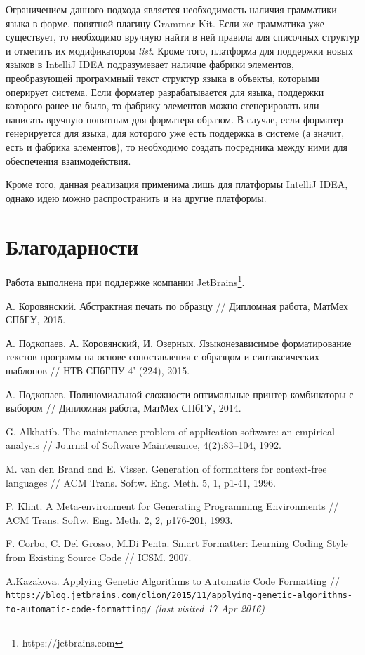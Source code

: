 \documentclass[conference]{IEEEtran}
\begin{document}
Ограничением данного подхода является необходимость наличия грамматики языка в форме, понятной плагину Grammar-Kit. 
Если же грамматика уже существует, то необходимо вручную найти в ней правила для списочных структур и отметить их модификатором \emph{list}.
Кроме того, платформа для поддержки новых языков в IntelliJ IDEA подразумевает наличие фабрики элементов, преобразующей программный текст структур языка в объекты, которыми оперирует система.
Если форматер разрабатывается для языка, поддержки которого ранее не было, то фабрику элементов можно сгенерировать или написать вручную понятным для форматера образом.
В случае, если форматер генерируется для языка, для которого уже есть поддержка в системе (а значит, есть и фабрика элементов), то необходимо создать посредника между ними для обеспечения взаимодействия.

Кроме того, данная реализация применима лишь для платформы IntelliJ IDEA, однако идею можно распространить и на другие платформы.

\section*{Благодарности}
Работа выполнена при поддержке компании JetBrains\footnote{https://jetbrains.com}.

\nocite{*}


\begin{thebibliography}{4}

  А. Коровянский. Абстрактная печать по образцу
  // Дипломная работа, МатМех СПбГУ, 2015.

  А. Подкопаев, А. Коровянский, И. Озерных.
  Языконезависимое форматирование текстов программ
  на основе сопоставления с образцом и синтаксических шаблонов
  // НТВ СПбГПУ 4' (224), 2015.

  А. Подкопаев. Полиномиальной сложности оптимальные принтер-комбинаторы с выбором
  // Дипломная работа, МатМех СПбГУ, 2014.
  
  G. Alkhatib.
  The maintenance problem of application software:
an empirical analysis //
  Journal of Software Maintenance, 4(2):83–104, 1992.
  
 M. van den Brand and E. Visser.
Generation of formatters for context-free languages //
ACM Trans. Softw. Eng. Meth. 5, 1, p1-41, 1996.

 P. Klint. A Meta-environment for Generating Programming Environments //
ACM Trans. Softw. Eng. Meth. 2, 2, p176-201, 1993.


 F. Corbo, C. Del Grosso, M.Di Penta.
Smart Formatter: Learning Coding Style from Existing Source Code //
ICSM. 2007.

 A.Kazakova.
Applying Genetic Algorithms to Automatic Code Formatting
// \texttt{https://blog.jetbrains.com/clion/2015/11/applying-genetic-algorithms-to-automatic-code-formatting/}
\emph{(last visited 17 Apr 2016)}
\end{thebibliography}
\end{document}
